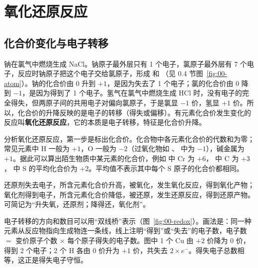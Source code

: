 \section{氧化还原反应}

\subsection{化合价变化与电子转移}
钠在氯气中燃烧生成 NaCl。钠原子最外层只有 1 个电子，氯原子最外层有 7 个电子，反应时钠原子把这个电子交给氯原子，形成  和 （见 0.4 节图~\ref{fig:00-atom}）。钠的化合价由 0 升到 $+1$，是因为失去了 1 个电子；氯的化合价由 0 降到 $-1$，是因为得到了 1 个电子。氢气在氯气中燃烧生成 HCl 时，没有电子的完全得失，但两原子间的共用电子对偏向氯原子，于是氯显 $-1$ 价，氢显 $+1$ 价。所以，化合价的升降反映的是电子的转移（得失或偏移）。有元素化合价发生变化的反应叫\textbf{氧化还原反应}，它的本质是电子转移，特征是化合价升降。

分析氧化还原反应，第一步是标出化合价。化合物中各元素化合价的代数和为零；常见元素中 H 一般为 $+1$，O 一般为 $-2$（过氧化物如 、 中为 $-1$），碱金属为 $+1$。据此可以算出陌生物质中某元素的化合价，例如  中 Cr 为 $+6$， 中 C 为 $+3$， 中 S 的平均化合价为 $+2$。平均值不表示其中每个 S 原子的化合价都相同。

\begin{gainian}[氧化还原反应的基本概念]
还原剂失去电子，所含元素化合价升高，被氧化，发生氧化反应，得到氧化产物；氧化剂得到电子，所含元素化合价降低，被还原，发生还原反应，得到还原产物。可简记为“升失氧，还原剂；降得还，氧化剂”。
\end{gainian}

电子转移的方向和数目可以用“双线桥”表示（图~\ref{fig:00-redox}）。画法是：同一种元素从反应物指向生成物连一条线，线上注明“得到”或“失去”的电子数，电子数 $=$ 变价原子个数 $\times$ 每个原子得失的电子数。图中 1 个 Cu 由 $+2$ 价降为 0 价，得到 2 个电子；2 个 H 各由 0 价升为 $+1$ 价，共失去 $2\times e^-$。得失电子总数相等，这正是得失电子守恒。


